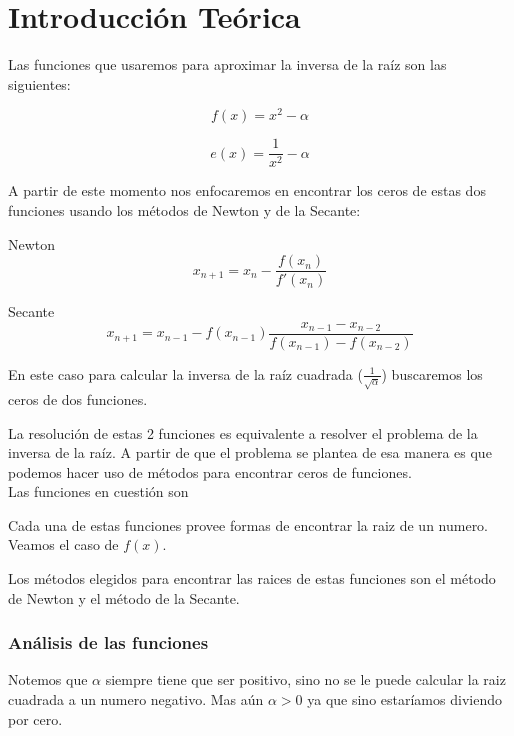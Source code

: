 \documentclass[10pt,a4paper]{article}
\begin{document}
\newpage
\section{Introducción Teórica}

Las funciones que usaremos para aproximar la inversa de la raíz son las siguientes:

\begin{displaymath}
    f(x) = x^2 - \alpha
\end{displaymath}

\begin{displaymath}
    e(x) = \frac{1}{x^2} - \alpha
\end{displaymath}

A partir de este momento nos enfocaremos en encontrar los ceros de estas dos funciones usando los métodos de Newton y de la Secante:

{\Large Newton}
\begin{displaymath}
    x_{n + 1} = x_n - \frac{f(x_n)}{f'(x_n)}
\end{displaymath}

{\Large Secante}
\begin{displaymath}
    x_{n + 1} = x_{n - 1} - f(x_{n - 1})\frac{x_{n - 1} - x_{n - 2}}{f(x_{n - 1}) - f(x_{n - 2})}
\end{displaymath}

En este caso para calcular la inversa de la raíz cuadrada
($\displaystyle\frac{1}{\sqrt{\alpha}}$) buscaremos los ceros de dos funciones.

La resolución de estas 2 funciones es equivalente a resolver el problema de la
inversa de la raíz. A partir de que el problema se plantea de esa manera es que
podemos hacer uso de métodos para encontrar ceros de funciones.\\

Las funciones en cuestión son


Cada una de estas funciones provee formas de encontrar la raiz de un numero.
Veamos el caso de $f(x)$.

Los métodos elegidos para encontrar las raices de estas funciones son el método
de Newton y el método de la Secante.

\subsubsection{Análisis de las funciones}

Notemos que $\alpha$ siempre tiene que ser positivo, sino no se le puede calcular la raiz cuadrada a un numero negativo. Mas aún $\alpha > 0$ ya que sino estaríamos diviendo por cero.
\end{document}
